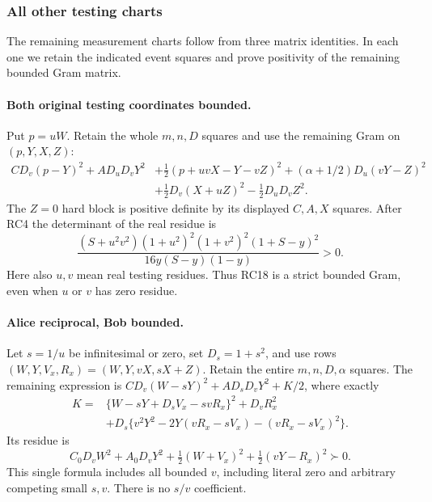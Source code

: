 \subsubsection*{All other testing charts}

The remaining measurement charts follow from three matrix
identities. In each one we retain the indicated event squares and
prove positivity of the remaining bounded Gram matrix.

\paragraph{Both original testing coordinates bounded.}
Put $p=uW$. Retain the whole $m,n,D$ squares and use the
remaining Gram on $(p,Y,X,Z)$:
\[
\begin{split}
 C D_v(p-Y)^2+A D_uD_vY^2
 &+\tfrac12(p+uvX-Y-vZ)^2+(\alpha+1/2)D_u(vY-Z)^2\\
 &+\tfrac12D_v(X+uZ)^2-\tfrac12D_uD_vZ^2.
\end{split}\tag{RC18}
\]
The $Z=0$ hard block is positive definite by its displayed
$C,A,X$ squares. After RC4 the determinant of the real residue is
\[
 \frac{(S+u^2v^2)(1+u^2)^2(1+v^2)^2(1+S-y)^2}
      {16y(S-y)(1-y)}>0.
 \tag{RC19}
\]
Here also $u,v$ mean real testing residues. Thus RC18 is a strict
bounded Gram, even when $u$ or $v$ has zero residue.

\paragraph{Alice reciprocal, Bob bounded.}
Let $s=1/u$ be infinitesimal or zero, set $D_s=1+s^2$, and use
rows $(W,Y,V_x,R_x)=(W,Y,vX,sX+Z)$. Retain the entire
$m,n,D,\alpha$ squares. The remaining expression is
$CD_v(W-sY)^2+AD_sD_vY^2+K/2$, where exactly
\[
\begin{split}
 K={}&\{W-sY+D_sV_x-svR_x\}^2+D_vR_x^2\\
 &+D_s\{v^2Y^2-2Y(vR_x-sV_x)-(vR_x-sV_x)^2\}.
\end{split}\tag{RC20}
\]
Its residue is
\[
 C_0D_vW^2+A_0D_vY^2
          +\tfrac12(W+V_x)^2+\tfrac12(vY-R_x)^2\succ0.
 \tag{RC21}
\]
This single formula includes all bounded $v$, including literal
zero and arbitrary competing small $s,v$. There is no $s/v$
coefficient.

